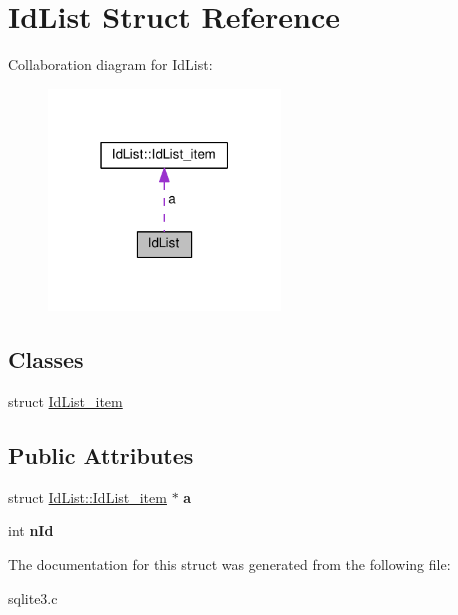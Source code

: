 \hypertarget{structIdList}{}\section{Id\+List Struct Reference}
\label{structIdList}


Collaboration diagram for Id\+List\+:\nopagebreak
\begin{figure}[H]
\begin{center}
\leavevmode
\includegraphics[width=175pt]{structIdList__coll__graph}
\end{center}
\end{figure}
\subsection*{Classes}
\begin{DoxyCompactItemize}
\item 
struct \hyperlink{structIdList_1_1IdList__item}{Id\+List\+\_\+item}
\end{DoxyCompactItemize}
\subsection*{Public Attributes}
\begin{DoxyCompactItemize}
\item 
struct \hyperlink{structIdList_1_1IdList__item}{Id\+List\+::\+Id\+List\+\_\+item} $\ast$ {\bfseries a}\hypertarget{structIdList_ad33082fd71286c1159711a1a3e979763}{}\label{structIdList_ad33082fd71286c1159711a1a3e979763}

\item 
int {\bfseries n\+Id}\hypertarget{structIdList_afb785717796d8b3c72d1ae682dcb6ff0}{}\label{structIdList_afb785717796d8b3c72d1ae682dcb6ff0}

\end{DoxyCompactItemize}


The documentation for this struct was generated from the following file\+:\begin{DoxyCompactItemize}
\item 
sqlite3.\+c\end{DoxyCompactItemize}
